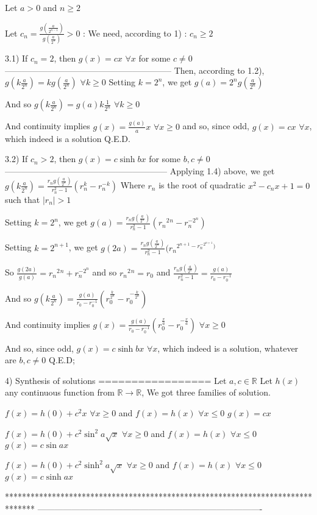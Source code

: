 \begin{solution}
Let $a>0$ and $n\ge 2$

Let $c_n=\frac {g(\frac a{2^{n-1}})}{g(\frac a{2^n})}>0$ : We need, according to 1) : $c_n\ge 2$

3.1) If $c_n=2$, then $g(x)=cx$ $\forall x$ for some $c\ne 0$
-----------------------------------------------------------
Then, according to 1.2), $g(k\frac a{2^n})=kg(\frac a{2^n})$ $\forall k\ge 0$
Setting $k=2^n$, we get $g(a)=2^ng(\frac a{2^n})$ 

And so $g(k\frac a{2^n})=g(a)k\frac 1{2^n}$ $\forall k\ge 0$

And continuity implies $g(x)=\frac{g(a)}ax$ $\forall x\ge 0$ and so, since odd, $g(x)=cx$ $\forall x$, which indeed is a solution
Q.E.D.

3.2) If $c_n>2$, then $g(x)=c\sinh bx$ for some $b,c\ne 0$
---------------------------------------------------------
Applying 1.4) above, we get $g(k\frac a{2^n})=\frac{r_ng(\frac a{2^n})}{r_n^2-1}(r_n^k-r_n^{-k})$
Where $r_n$ is the root of quadratic $x^2-c_nx+1=0$ such that $|r_n|>1$

Setting $k=2^n$, we get $g(a)=\frac{r_ng(\frac a{2^n})}{r_n^2-1}(r_n{}^2{}^n-r_n^{-2^n})$

Setting $k=2^{n+1}$, we get $g(2a)=\frac{r_ng(\frac a{2^n})}{r_n^2-1}(r_n{}^{2{}^{n+1}-r_n^{-2^{n+1}})}$

So $\frac{g(2a)}{g(a)}=r_n{}^2{}^n+r_n^{-2^n}$ and so $r_n{}^2{}^n=r_0$ and $\frac{r_ng(\frac a{2^n})}{r_n^2-1}=\frac{g(a)}{r_0-r_0^{-1}}$

And so $g(k\frac a{2^n})=\frac{g(a)}{r_0-r_0^{-1}}(r_0^{\frac k{2^n}}-r_0^{-\frac k{2^n}})$

And continuity implies $g(x)=\frac{g(a)}{r_0-r_0^{-1}}(r_0^{\frac xa}-r_0^{-\frac xa})$ $\forall x\ge 0$

And so, since odd, $g(x)=c\sinh bx$ $\forall x$, which indeed is a solution, whatever are $b,c\ne 0$
Q.E.D;

4) Synthesis of solutions
=================
Let $a,c\in\mathbb R$ 
Let $h(x)$ any continuous function from $\mathbb R\to\mathbb R$,
We got three families of solution.

$f(x)=h(0)+c^2x$ $\forall x\ge 0$ and $f(x)=h(x)$ $\forall x\le 0$
$g(x)=cx$

$f(x)=h(0)+c^2\sin^2 a\sqrt x$ $\forall x\ge 0$ and $f(x)=h(x)$ $\forall x\le 0$
$g(x)=c\sin ax$

$f(x)=h(0)+c^2\sinh^2 a\sqrt x$ $\forall x\ge 0$ and $f(x)=h(x)$ $\forall x\le 0$
$g(x)=c\sinh ax$
\end{solution}
*******************************************************************************
-------------------------------------------------------------------------------

